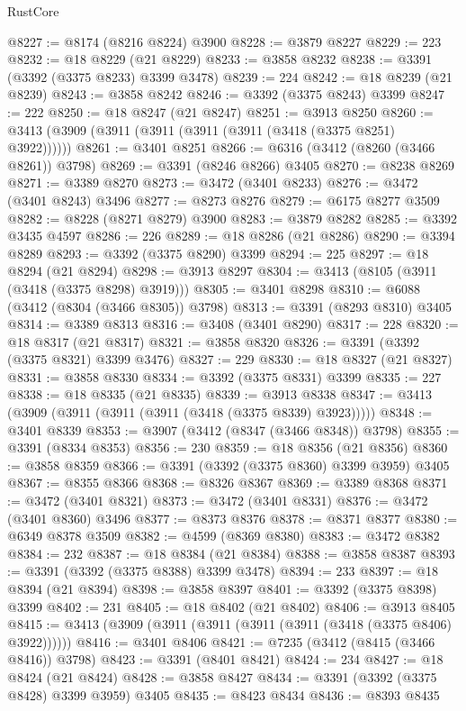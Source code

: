\begin{lexlean}{RustCore}
\begin{coremodule}
@8227 := @8174 (@8216 @8224) @3900
@8228 := @3879 @8227
@8229 := 223
@8232 := @18 @8229 (@21 @8229)
@8233 := @3858 @8232
@8238 := @3391 (@3392 (@3375 @8233) @3399 @3478)
@8239 := 224
@8242 := @18 @8239 (@21 @8239)
@8243 := @3858 @8242
@8246 := @3392 (@3375 @8243) @3399
@8247 := 222
@8250 := @18 @8247 (@21 @8247)
@8251 := @3913 @8250
@8260 := @3413 (@3909 (@3911 (@3911 (@3911 (@3911 (@3418 (@3375 @8251) @3922))))))
@8261 := @3401 @8251
@8266 := @6316 (@3412 (@8260 (@3466 @8261)) @3798)
@8269 := @3391 (@8246 @8266) @3405
@8270 := @8238 @8269
@8271 := @3389 @8270
@8273 := @3472 (@3401 @8233)
@8276 := @3472 (@3401 @8243) @3496
@8277 := @8273 @8276
@8279 := @6175 @8277 @3509
@8282 := @8228 (@8271 @8279) @3900
@8283 := @3879 @8282
@8285 := @3392 @3435 @4597
@8286 := 226
@8289 := @18 @8286 (@21 @8286)
@8290 := @3394 @8289
@8293 := @3392 (@3375 @8290) @3399
@8294 := 225
@8297 := @18 @8294 (@21 @8294)
@8298 := @3913 @8297
@8304 := @3413 (@8105 (@3911 (@3418 (@3375 @8298) @3919)))
@8305 := @3401 @8298
@8310 := @6088 (@3412 (@8304 (@3466 @8305)) @3798)
@8313 := @3391 (@8293 @8310) @3405
@8314 := @3389 @8313
@8316 := @3408 (@3401 @8290)
@8317 := 228
@8320 := @18 @8317 (@21 @8317)
@8321 := @3858 @8320
@8326 := @3391 (@3392 (@3375 @8321) @3399 @3476)
@8327 := 229
@8330 := @18 @8327 (@21 @8327)
@8331 := @3858 @8330
@8334 := @3392 (@3375 @8331) @3399
@8335 := 227
@8338 := @18 @8335 (@21 @8335)
@8339 := @3913 @8338
@8347 := @3413 (@3909 (@3911 (@3911 (@3911 (@3418 (@3375 @8339) @3923)))))
@8348 := @3401 @8339
@8353 := @3907 (@3412 (@8347 (@3466 @8348)) @3798)
@8355 := @3391 (@8334 @8353)
@8356 := 230
@8359 := @18 @8356 (@21 @8356)
@8360 := @3858 @8359
@8366 := @3391 (@3392 (@3375 @8360) @3399 @3959) @3405
@8367 := @8355 @8366
@8368 := @8326 @8367
@8369 := @3389 @8368
@8371 := @3472 (@3401 @8321)
@8373 := @3472 (@3401 @8331)
@8376 := @3472 (@3401 @8360) @3496
@8377 := @8373 @8376
@8378 := @8371 @8377
@8380 := @6349 @8378 @3509
@8382 := @4599 (@8369 @8380)
@8383 := @3472 @8382
@8384 := 232
@8387 := @18 @8384 (@21 @8384)
@8388 := @3858 @8387
@8393 := @3391 (@3392 (@3375 @8388) @3399 @3478)
@8394 := 233
@8397 := @18 @8394 (@21 @8394)
@8398 := @3858 @8397
@8401 := @3392 (@3375 @8398) @3399
@8402 := 231
@8405 := @18 @8402 (@21 @8402)
@8406 := @3913 @8405
@8415 := @3413 (@3909 (@3911 (@3911 (@3911 (@3911 (@3418 (@3375 @8406) @3922))))))
@8416 := @3401 @8406
@8421 := @7235 (@3412 (@8415 (@3466 @8416)) @3798)
@8423 := @3391 (@8401 @8421)
@8424 := 234
@8427 := @18 @8424 (@21 @8424)
@8428 := @3858 @8427
@8434 := @3391 (@3392 (@3375 @8428) @3399 @3959) @3405
@8435 := @8423 @8434
@8436 := @8393 @8435

\end{coremodule}
\end{lexlean}
